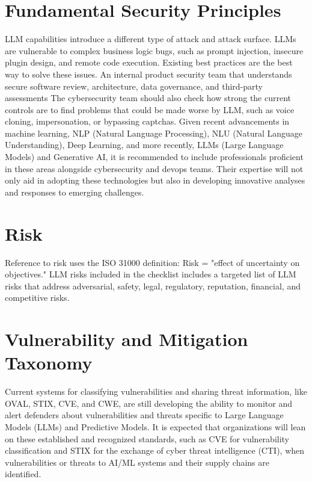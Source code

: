 \section{Fundamental Security Principles}
LLM capabilities introduce a different type of attack and attack surface. LLMs
are vulnerable to complex business logic bugs, such as prompt injection,
insecure plugin design, and remote code execution. Existing best practices are
the best way to solve these issues. An internal product security team that understands secure software review, architecture, data governance, and third-party assessments The cybersecurity team should also check how strong the current controls are to find problems that could be made worse by LLM, such as voice cloning, impersonation, or bypassing captchas.
Given recent advancements in machine learning, NLP (Natural Language Processing), NLU (Natural Language Understanding), Deep Learning, and more recently, LLMs (Large Language Models) and Generative AI, it is recommended to include professionals proficient in these areas alongside cybersecurity and devops teams. Their expertise will not only aid in adopting these technologies but also in developing innovative analyses and responses to emerging challenges.

\clearpage

\section{Risk}
Reference to risk uses the ISO 31000 definition: Risk = "effect of uncertainty
on objectives." LLM risks included in the checklist includes a targeted list of
LLM risks that address adversarial, safety, legal, regulatory, reputation,
financial, and competitive risks.

\section{Vulnerability and Mitigation Taxonomy}
Current systems for classifying vulnerabilities and sharing threat information,
like OVAL, STIX, CVE, and CWE, are still developing the ability to monitor and
alert defenders about vulnerabilities and threats specific to Large Language
Models (LLMs) and Predictive Models. It is expected that organizations will
lean on these established and recognized standards, such as CVE for
vulnerability classification and STIX for the exchange of cyber threat
intelligence (CTI), when vulnerabilities or threats to AI/ML systems and their
supply chains are identified.
